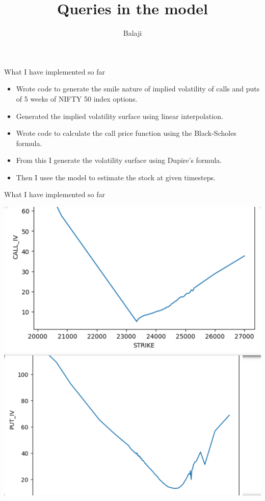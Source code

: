 \documentclass{beamer}
\title{Queries in the model}
\author{Balaji}
\date{}
\institute{IISc Bangalore}
\begin{document}
\maketitle
\begin{frame}{What I have implemented so far}
    \begin{itemize}
        \item Wrote code to generate the smile nature of implied volatility of calls and puts of 5 weeks of NIFTY 50 index options.
        \item Generated the implied volatility surface using linear interpolation.
        \item Wrote code to calculate the call price function using the Black-Scholes formula.
        \item From this I generate the volatility surface using Dupire's formula.
        \item Then I usee the model to estimate the stock at given timesteps.
    \end{itemize}
\end{frame}
\begin{frame}{What I have implemented so far}
    \begin{center}
    \includegraphics[scale = 0.25]{IV_call}
    \includegraphics[scale = 0.25]{IV_put}
    \end{center}
\end{frame}
\end{document}
